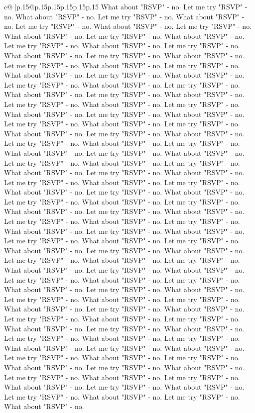 \documentclass{article}
\begin{document}
{\begin{supertabular}{c@{$\;$}|p{.15\linewidth}@{}p{.15\linewidth}p{.15\linewidth}p{.15\linewidth}p{.15\linewidth}p{.15\linewidth}}
{{{What about "RSVP" {-} no. Let me try "RSVP" {-} no. What about "RSVP" {-} no. Let me try "RSVP" {-} no. What about "RSVP" {-} no. Let me try "RSVP" {-} no. What about "RSVP" {-} no. Let me try "RSVP" {-} no. What about "RSVP" {-} no. Let me try "RSVP" {-} no. What about "RSVP" {-} no. Let me try "RSVP" {-} no. What about "RSVP" {-} no. Let me try "RSVP" {-} no. What about "RSVP" {-} no. Let me try "RSVP" {-} no. What about "RSVP" {-} no. Let me try "RSVP" {-} no. What about "RSVP" {-} no. Let me try "RSVP" {-} no. What about "RSVP" {-} no. Let me try "RSVP" {-} no. What about "RSVP" {-} no. Let me try "RSVP" {-} no. What about "RSVP" {-} no. Let me try "RSVP" {-} no. What about "RSVP" {-} no. Let me try "RSVP" {-} no. What about "RSVP" {-} no. Let me try "RSVP" {-} no. What about "RSVP" {-} no. Let me try "RSVP" {-} no. What about "RSVP" {-} no. Let me try "RSVP" {-} no. What about "RSVP" {-} no. Let me try "RSVP" {-} no. What about "RSVP" {-} no. Let me try "RSVP" {-} no. What about "RSVP" {-} no. Let me try "RSVP" {-} no. What about "RSVP" {-} no. Let me try "RSVP" {-} no. What about "RSVP" {-} no. Let me try "RSVP" {-} no. What about "RSVP" {-} no. Let me try "RSVP" {-} no. What about "RSVP" {-} no. Let me try "RSVP" {-} no. What about "RSVP" {-} no. Let me try "RSVP" {-} no. What about "RSVP" {-} no. Let me try "RSVP" {-} no. What about "RSVP" {-} no. Let me try "RSVP" {-} no. What about "RSVP" {-} no. Let me try "RSVP" {-} no. What about "RSVP" {-} no. Let me try "RSVP" {-} no. What about "RSVP" {-} no. Let me try "RSVP" {-} no. What about "RSVP" {-} no. Let me try "RSVP" {-} no. What about "RSVP" {-} no. Let me try "RSVP" {-} no. What about "RSVP" {-} no. Let me try "RSVP" {-} no. What about "RSVP" {-} no. Let me try "RSVP" {-} no. What about "RSVP" {-} no. Let me try "RSVP" {-} no. What about "RSVP" {-} no. Let me try "RSVP" {-} no. What about "RSVP" {-} no. Let me try "RSVP" {-} no. What about "RSVP" {-} no. Let me try "RSVP" {-} no. What about "RSVP" {-} no. Let me try "RSVP" {-} no. What about "RSVP" {-} no. Let me try "RSVP" {-} no. What about "RSVP" {-} no. Let me try "RSVP" {-} no. What about "RSVP" {-} no. Let me try "RSVP" {-} no. What about "RSVP" {-} no. Let me try "RSVP" {-} no. What about "RSVP" {-} no. Let me try "RSVP" {-} no. What about "RSVP" {-} no. Let me try "RSVP" {-} no. What about "RSVP" {-} no. Let me try "RSVP" {-} no. What about "RSVP" {-} no. Let me try "RSVP" {-} no. What about "RSVP" {-} no. Let me try "RSVP" {-} no. What about "RSVP" {-} no. Let me try "RSVP" {-} no. What about "RSVP" {-} no. Let me try "RSVP" {-} no. What about "RSVP" {-} no. Let me try "RSVP" {-} no. What about "RSVP" {-} no. Let me try "RSVP" {-} no. What about "RSVP" {-} no. Let me try "RSVP" {-} no. What about "RSVP" {-} no. Let me try "RSVP" {-} no. What about "RSVP" {-} no. Let me try "RSVP" {-} no. What about "RSVP" {-} no. Let me try "RSVP" {-} no. What about "RSVP" {-} no. Let me try "RSVP" {-} no. What about "RSVP" {-} no. Let me try "RSVP" {-} no. What about "RSVP" {-} no. Let me try "RSVP" {-} no. What about "RSVP" {-} no. Let me try "RSVP" {-} no. What about "RSVP" {-} no. Let me try "RSVP" {-} no. What about "RSVP" {-} no. }}}
\end{supertabular}}
\end{document}

